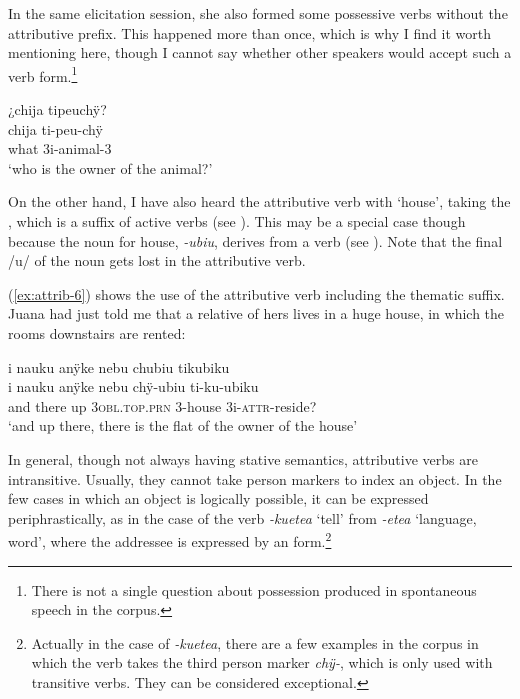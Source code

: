 In the same elicitation session, she also formed some possessive verbs without the attributive prefix. This happened more than once, which is why I find it worth mentioning here, though I cannot say whether other speakers would accept such a verb form.\footnote{There is not a single question about possession produced in spontaneous speech in the corpus.}

\ea\label{ex:attrib-5}
\begingl
\glpreamble ¿chija tipeuchÿ?\\
\gla chija ti-peu-chÿ\\
\glb what 3i-animal-3\\
\glft ‘who is the owner of the animal?'
\endgl
\trailingcitation{[rxx-e201231f.06]}
\xe

On the other hand, I have also heard the attributive verb with ‘house’, taking the , which is a suffix of active verbs (see ). This may be a special case though because the noun for house, \textit{-ubiu}, derives from a verb (see ). Note that the final /u/ of the noun gets lost in the attributive verb.

(\ref{ex:attrib-6}) shows the use of the attributive verb including the thematic suffix. Juana had just told me that a relative of hers lives in a huge house, in which the rooms downstairs are rented:

\ea\label{ex:attrib-6}
\begingl
\glpreamble i nauku anÿke nebu chubiu tikubiku\\
\gla i nauku anÿke nebu chÿ-ubiu ti-ku-ubiku\\
\glb and there up 3\textsc{obl.top.prn} 3-house 3i-\textsc{attr}-reside?\\
\glft ‘and up there, there is the flat of the owner of the house’
\endgl
\trailingcitation{[jxx-p120430l-1.416]}
\xe 

In general, though not always having stative semantics, attributive verbs are intransitive. Usually, they cannot take person markers to index an object. In the few cases in which an object is logically possible, it can be expressed periphrastically, as in the case of the verb \textit{-kuetea} ‘tell’ from \textit{-etea} ‘language, word’, where the addressee is expressed by an  form.\footnote{Actually in the case of \textit{-kuetea}, there are a few examples in the corpus in which the verb takes the third person marker \textit{chÿ-}, which is only used with transitive verbs. They can be considered exceptional.}

